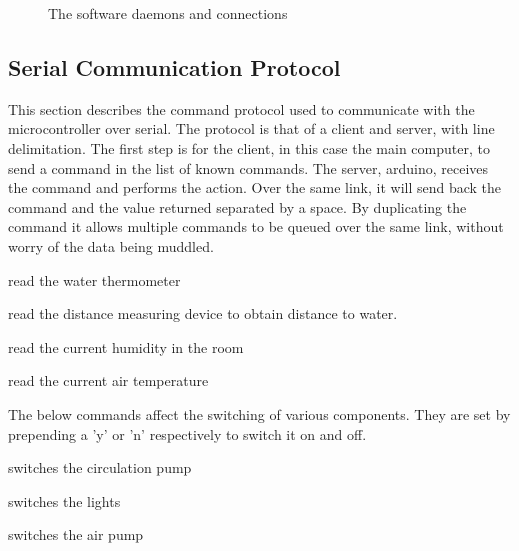 \documentclass[american,12pt]{article}
\begin{document}
\begin{figure}[h]
    \centering
    \caption{The software daemons and connections}
    \label{fig:Software Architecture}
\end{figure}

\subsection{Serial Communication Protocol}
This section describes the command protocol used to communicate with the
microcontroller over serial. The protocol is that of a client and server,
with line delimitation. The first step is for the client, in this case the
main computer, to send a command in the list of known commands. The server,
arduino, receives the command and performs the action. Over the same link, it
will send back the command and the value returned separated by a space. By
duplicating the command it allows multiple commands to be queued over the same
link, without worry of the data being muddled.

\begin{description}[style=nextline]
    \item[rWatThm] read the water thermometer
    \item[rdWaLvl] read the distance measuring device to obtain distance to water.
    \item[rdHumid] read the current humidity in the room
    \item[rdAirTm] read the current air temperature
\end{description}

The below commands affect the switching of various components. They are set by
prepending a 'y' or 'n' respectively to switch it on and off.

\begin{description}[style=nextline]
    \item[CiPump] switches the circulation pump
    \item[Lights] switches the lights
    \item[AirPmp] switches the air pump
\end{description}
\end{document}

